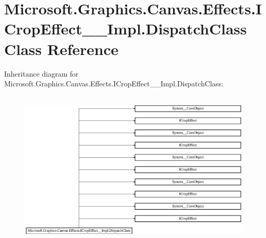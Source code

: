 \hypertarget{class_microsoft_1_1_graphics_1_1_canvas_1_1_effects_1_1_i_crop_effect_____impl_1_1_dispatch_class}{}\section{Microsoft.\+Graphics.\+Canvas.\+Effects.\+I\+Crop\+Effect\+\_\+\+\_\+\+Impl.\+Dispatch\+Class Class Reference}
\label{class_microsoft_1_1_graphics_1_1_canvas_1_1_effects_1_1_i_crop_effect_____impl_1_1_dispatch_class}
Inheritance diagram for Microsoft.\+Graphics.\+Canvas.\+Effects.\+I\+Crop\+Effect\+\_\+\+\_\+\+Impl.\+Dispatch\+Class\+:\begin{figure}[H]
\begin{center}
\leavevmode
\includegraphics[height=7.586207cm]{class_microsoft_1_1_graphics_1_1_canvas_1_1_effects_1_1_i_crop_effect_____impl_1_1_dispatch_class}
\end{center}
\end{figure}
